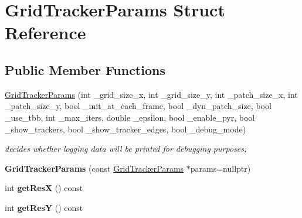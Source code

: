 \hypertarget{structGridTrackerParams}{\section{Grid\-Tracker\-Params Struct Reference}
\label{structGridTrackerParams}
}
\subsection*{Public Member Functions}
\begin{DoxyCompactItemize}
\item 
\hyperlink{structGridTrackerParams_a909407a7a008e4b02a83eda24eef748c}{Grid\-Tracker\-Params} (int \-\_\-grid\-\_\-size\-\_\-x, int \-\_\-grid\-\_\-size\-\_\-y, int \-\_\-patch\-\_\-size\-\_\-x, int \-\_\-patch\-\_\-size\-\_\-y, bool \-\_\-init\-\_\-at\-\_\-each\-\_\-frame, bool \-\_\-dyn\-\_\-patch\-\_\-size, bool \-\_\-use\-\_\-tbb, int \-\_\-max\-\_\-iters, double \-\_\-epsilon, bool \-\_\-enable\-\_\-pyr, bool \-\_\-show\-\_\-trackers, bool \-\_\-show\-\_\-tracker\-\_\-edges, bool \-\_\-debug\-\_\-mode)
\begin{DoxyCompactList}\small\item\em decides whether logging data will be printed for debugging purposes; \end{DoxyCompactList}\item 
\hypertarget{structGridTrackerParams_a3fd4e79f4ce89397f6239ff1658a80dd}{{\bfseries Grid\-Tracker\-Params} (const \hyperlink{structGridTrackerParams}{Grid\-Tracker\-Params} $\ast$params=nullptr)}\label{structGridTrackerParams_a3fd4e79f4ce89397f6239ff1658a80dd}

\item 
\hypertarget{structGridTrackerParams_ac001ebdaf16625b4ef34b17dc2aea24f}{int {\bfseries get\-Res\-X} () const }\label{structGridTrackerParams_ac001ebdaf16625b4ef34b17dc2aea24f}

\item 
\hypertarget{structGridTrackerParams_a26dec741dd46de003cecf0c00c25d1ce}{int {\bfseries get\-Res\-Y} () const }\label{structGridTrackerParams_a26dec741dd46de003cecf0c00c25d1ce}

\end{DoxyCompactItemize}
